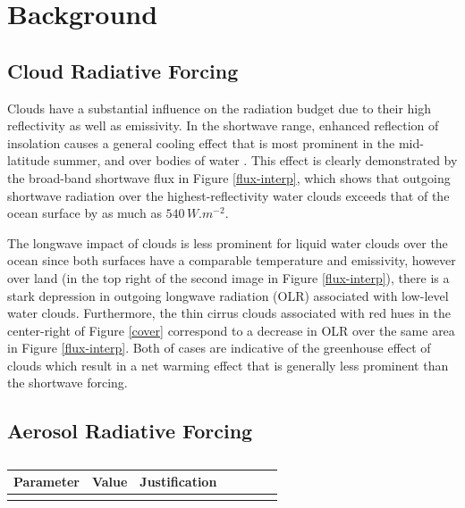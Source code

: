 \documentclass[12pt]{article}
\begin{document}
\section{Background}

    \subsection{Cloud Radiative Forcing}

     Clouds have a substantial influence on the radiation budget due to their high reflectivity as well as emissivity. In the shortwave range, enhanced reflection of insolation causes a general cooling effect that is most prominent in the mid-latitude summer, and over bodies of water \cite{harrison_seasonal_1990}. This effect is clearly demonstrated by the broad-band shortwave flux in Figure \ref{flux-interp}, which shows that outgoing shortwave radiation over the highest-reflectivity water clouds exceeds that of the ocean surface by as much as $540\,\si{W.m^{-2}}$.

    The longwave impact of clouds is less prominent for liquid water clouds over the ocean since both surfaces have a comparable temperature and emissivity, however over land (in the top right of the second image in Figure \ref{flux-interp}), there is a stark depression in outgoing longwave radiation (OLR) associated with low-level water clouds. Furthermore, the thin cirrus clouds associated with red hues in the center-right of Figure \ref{cover} correspond to a decrease in OLR over the same area in Figure \ref{flux-interp}. Both of cases are indicative of the greenhouse effect of clouds which result in a net warming effect that is generally less prominent than the shortwave forcing.

    \subsection{Aerosol Radiative Forcing}

\begin{table}[h!]
    \centering
    \begin{tabular}{ m{.15\linewidth} | m{.15\linewidth} | m{0.6\linewidth}}
        \textbf{Parameter} & \textbf{Value} & \textbf{Justification} \\
        \hline
        & & \\
    \end{tabular}
    \caption{}
    \label{}
\end{table}
\end{document}
